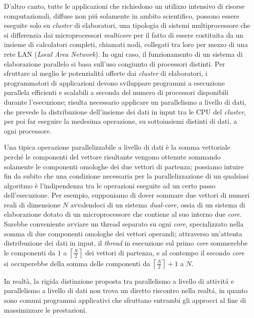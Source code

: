 D'altro canto, tutte le applicazioni che richiedono un utilizzo intensivo di risorse computazionali, diffuse non pi\'u solamente in ambito
scientifico, possono essere eseguite solo su \textit{cluster} di elaboratori, una tipologia di sistemi multiprocessore che si differenzia dai microprocessori \textit{multicore} per il fatto di essere costituita da un insieme di calcolatori completi, chiamati nodi, collegati tra loro per mezzo di una rete LAN (\textit{Local Area Network}).\newline
In ogni caso, il funzionamento di un sistema di elaborazione parallelo si basa sull'uso congiunto di processori distinti.\newline
Per sfruttare al meglio le potenzialit\'a offerte dai \textit{cluster} di elaboratori, i programmatori di applicazioni devono sviluppare programmi a esecuzione parallela efficienti e scalabili a seconda del numero di processori disponibili durante l'esecuzione; risulta necessario applicare un parallelismo a livello di dati, che prevede la distribuzione dell'insieme dei dati in input tra le CPU del \textit{cluster}, per poi far eseguire la medesima operazione, su sottoinsiemi distinti di dati, a ogni processore.

Una tipica operazione parallelizzabile a livello di dati è la somma vettoriale perch\'e le componenti del vettore risultante vengono ottenute
sommando solamente le componenti omologhe dei due vettori di partenza; possiamo intuire fin da subito che una condizione necessaria per la parallelizzazione di un qualsiasi algoritmo è l'indipendenza tra le operazioni eseguite ad un certo passo dell'esecuzione.\newline
Per esempio, supponiamo di dover sommare due vettori di numeri reali di dimensione $N$ avvalendoci di un sistema \textit{dual-core}, ossia di un sistema di elaborazione dotato di un microprocessore che contiene al suo interno
due \textit{core}.\newline
Sarebbe conveniente avviare un thread separato su ogni \textit{core}, specializzato nella somma di due componenti omologhe dei vettori operandi; attraverso un'attenta distribuzione dei dati in input, il \textit{thread} in esecuzione sul primo \textit{core} sommerebbe le componenti da $1$ a $\left\lceil\frac{N}{2}\right\rceil$ dei vettori di partenza,
e al contempo il secondo \textit{core} si occuperebbe della somma delle componenti da $\left\lceil\frac{N}{2}\right\rceil + 1$ a $N$.

In realtà, la rigida distinzione proposta tra parallelismo a livello di attivit\'a e parallelismo a livello di dati non trova un diretto
riscontro nella realt\'a, in quanto sono comuni programmi applicativi che sfruttano entrambi gli approcci al fine di massimizzare le prestazioni.

